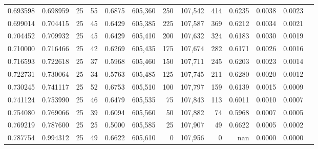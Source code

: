 \begin{tabular}{rrrrrrrrrrrrr}
0.693598 & 0.698959 &    25 &  55 &                                     0.6875 & 605,360 &     250 & 107,542 &     414 & 0.6235 & 0.0038 & 0.0023 \\
0.699014 & 0.704415 &    25 &  45 &                                     0.6429 & 605,385 &     225 & 107,587 &     369 & 0.6212 & 0.0034 & 0.0021 \\
0.704452 & 0.709932 &    25 &  45 &                                     0.6429 & 605,410 &     200 & 107,632 &     324 & 0.6183 & 0.0030 & 0.0019 \\
0.710000 & 0.716466 &    25 &  42 &                                     0.6269 & 605,435 &     175 & 107,674 &     282 & 0.6171 & 0.0026 & 0.0016 \\
0.716593 & 0.722618 &    25 &  37 &                                     0.5968 & 605,460 &     150 & 107,711 &     245 & 0.6203 & 0.0023 & 0.0014 \\
0.722731 & 0.730064 &    25 &  34 &                                     0.5763 & 605,485 &     125 & 107,745 &     211 & 0.6280 & 0.0020 & 0.0012 \\
0.730245 & 0.741117 &    25 &  52 &                                     0.6753 & 605,510 &     100 & 107,797 &     159 & 0.6139 & 0.0015 & 0.0009 \\
0.741124 & 0.753990 &    25 &  46 &                                     0.6479 & 605,535 &      75 & 107,843 &     113 & 0.6011 & 0.0010 & 0.0007 \\
0.754080 & 0.769066 &    25 &  39 &                                     0.6094 & 605,560 &      50 & 107,882 &      74 & 0.5968 & 0.0007 & 0.0005 \\
0.769219 & 0.787600 &    25 &  25 &                                     0.5000 & 605,585 &      25 & 107,907 &      49 & 0.6622 & 0.0005 & 0.0002 \\
0.787754 & 0.994312 &    25 &  49 &                                     0.6622 & 605,610 &       0 & 107,956 &       0 &    nan & 0.0000 & 0.0000 \\
\bottomrule
\end{tabular}
